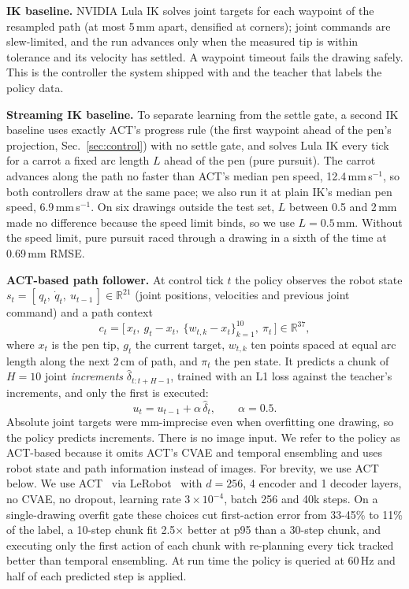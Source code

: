 \documentclass[conference]{IEEEtran}
\newcommand{\mm}{\,mm\xspace}
\begin{document}
\textbf{IK baseline.} NVIDIA Lula IK solves joint targets for each waypoint of the resampled path (at most
5\mm apart, densified at corners); joint commands are slew-limited, and the run advances only when the measured
tip is within tolerance and its velocity has settled. A waypoint timeout fails the drawing safely. This is the
controller the system shipped with and the teacher that labels the policy data.

\textbf{Streaming IK baseline.} To separate learning from the settle gate, a second IK baseline uses exactly
ACT's progress rule (the first waypoint ahead of the pen's projection, Sec.~\ref{sec:control}) with no settle
gate, and solves Lula IK every tick for a carrot a fixed arc length $L$ ahead of the pen (pure pursuit). The carrot
advances along the path no faster than ACT's median pen speed, 12.4\mm\,s$^{-1}$, so both controllers draw at
the same pace; we also run it at plain IK's median pen speed, 6.9\mm\,s$^{-1}$. On six drawings outside the test
set, $L$ between 0.5 and 2\mm made no difference because the speed limit binds, so we use $L=0.5$\mm. Without
the speed limit, pure pursuit raced through a drawing in a sixth of the time at 0.69\mm RMSE.

\textbf{ACT-based path follower.} At control tick $t$ the policy observes the robot state
$s_t = [\,q_t,\ \dot q_t,\ u_{t-1}\,] \in \mathbb{R}^{21}$ (joint positions, velocities and previous joint
command) and a path context
\begin{equation}
  c_t = \big[\,x_t,\ g_t - x_t,\ \{w_{t,k} - x_t\}_{k=1}^{10},\ \pi_t\,\big] \in \mathbb{R}^{37},
\end{equation}
where $x_t$ is the pen tip, $g_t$ the current target, $w_{t,k}$ ten points spaced at equal arc length along the
next 2\,cm of path, and $\pi_t$ the pen state. It predicts a chunk of $H=10$ joint \emph{increments}
$\hat\delta_{t:t+H-1}$, trained with an L1 loss against the teacher's increments, and only the first is
executed:
\begin{equation}
  u_t = u_{t-1} + \alpha\, \hat\delta_t , \qquad \alpha = 0.5 .
  \label{eq:step}
\end{equation}
Absolute joint targets were mm-imprecise even when overfitting one drawing, so the policy predicts increments.
There is no image input. We refer to the policy as ACT-based because it omits ACT's CVAE and temporal
ensembling and uses robot state and path information instead of images. For brevity, we use ACT below. We use
ACT~\cite{zhao2023act} via LeRobot~\cite{lerobot2024} with $d=256$, 4
encoder and 1 decoder layers, no CVAE, no dropout, learning rate $3\times10^{-4}$, batch 256 and 40k steps. On a
single-drawing overfit gate these choices cut first-action error from 33-45\% to 11\% of the label, a 10-step
chunk fit 2.5$\times$ better at p95 than a 30-step chunk, and executing only the first action of each chunk
with re-planning every tick tracked better than temporal ensembling. At run time the policy is queried at
60\,Hz and half of each predicted step is applied.
\end{document}
